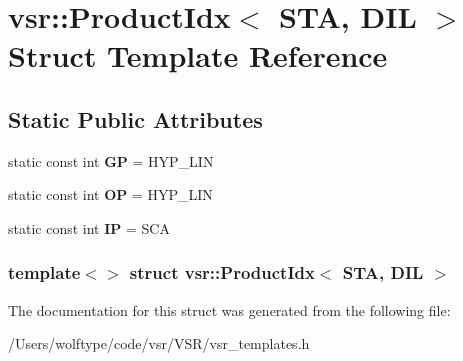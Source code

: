 \hypertarget{structvsr_1_1_product_idx_3_01_s_t_a_00_01_d_i_l_01_4}{\section{vsr\-:\-:Product\-Idx$<$ S\-T\-A, D\-I\-L $>$ Struct Template Reference}
\label{structvsr_1_1_product_idx_3_01_s_t_a_00_01_d_i_l_01_4}
}
\subsection*{Static Public Attributes}
\begin{DoxyCompactItemize}
\item 
\hypertarget{structvsr_1_1_product_idx_3_01_s_t_a_00_01_d_i_l_01_4_ab8fe19a15685c264379f8f08522a55cf}{static const int {\bfseries G\-P} = H\-Y\-P\-\_\-\-L\-I\-N}\label{structvsr_1_1_product_idx_3_01_s_t_a_00_01_d_i_l_01_4_ab8fe19a15685c264379f8f08522a55cf}

\item 
\hypertarget{structvsr_1_1_product_idx_3_01_s_t_a_00_01_d_i_l_01_4_a61ffc953bad85c8c81e18d6a481ea67a}{static const int {\bfseries O\-P} = H\-Y\-P\-\_\-\-L\-I\-N}\label{structvsr_1_1_product_idx_3_01_s_t_a_00_01_d_i_l_01_4_a61ffc953bad85c8c81e18d6a481ea67a}

\item 
\hypertarget{structvsr_1_1_product_idx_3_01_s_t_a_00_01_d_i_l_01_4_aa7e6c381c2f7812b3b771f7436713bbd}{static const int {\bfseries I\-P} = S\-C\-A}\label{structvsr_1_1_product_idx_3_01_s_t_a_00_01_d_i_l_01_4_aa7e6c381c2f7812b3b771f7436713bbd}

\end{DoxyCompactItemize}
\subsubsection*{template$<$$>$ struct vsr\-::\-Product\-Idx$<$ S\-T\-A, D\-I\-L $>$}



The documentation for this struct was generated from the following file\-:\begin{DoxyCompactItemize}
\item 
/\-Users/wolftype/code/vsr/\-V\-S\-R/vsr\-\_\-templates.\-h\end{DoxyCompactItemize}
